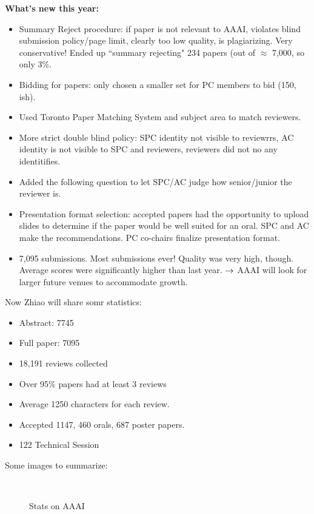 {\bf What's new this year:}
\begin{itemize}
    \item Summary Reject procedure: if paper is not relevant to AAAI, violates blind submission policy/page limit, clearly too low quality, is plagiarizing. Very conservative! Ended up ``summary rejecting" 234 papers (out of $\approx$ 7,000, so only $3\%$.
    \item Bidding for papers: only chosen a smaller set for PC members to bid (150, ish).
    \item Used Toronto Paper Matching System and subject area to match reviewers.
    \item More strict double blind policy: SPC identity not visible to reviewrrs, AC identity is not visible to SPC and reviewers, reviewers did not no any identitifies.
    \item Added the following question to let SPC/AC judge how senior/junior the reviewer is.
    \item Presentation format selection: accepted papers had the opportunity to upload slides to determine if the paper would be well suited for an oral. SPC and AC make the recommendations. PC co-chairs finalize presentation format.
    \item 7,095 submissions. Most submissions ever! Quality was very high, though. Average scores were significantly higher than last year.
    $\rightarrow$ AAAI will look for larger future venues to accommodate growth.
\end{itemize}

Now Zhiao will share somr statistics:
\begin{itemize}
    \item Abstract: 7745
    \item Full paper: 7095
    \item 18,191 reviews collected
    \item Over 95\% papers had at least 3 reviews
    \item Average 1250 characters for each review.
    \item Accepted 1147, 460 orals, 687 poster papers.
    \item 122 Technical Session
\end{itemize}

Some images to summarize:

\begin{figure}[h!]
    \centering
     \\
    \caption{Stats on AAAI}
    \label{fig:aaai_stats}
\end{figure}


